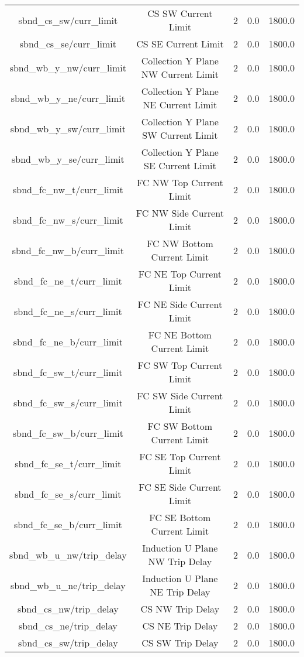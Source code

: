 \begin{center}
\begin{longtable}{c | c c c c }
sbnd\_cs\_sw/curr\_limit & CS SW Current Limit & 2 & 0.0 & 1800.0\\ 
sbnd\_cs\_se/curr\_limit & CS SE Current Limit & 2 & 0.0 & 1800.0\\ 
sbnd\_wb\_y\_nw/curr\_limit & Collection Y Plane NW Current Limit & 2 & 0.0 & 1800.0\\ 
sbnd\_wb\_y\_ne/curr\_limit & Collection Y Plane NE Current Limit & 2 & 0.0 & 1800.0\\ 
sbnd\_wb\_y\_sw/curr\_limit & Collection Y Plane SW Current Limit & 2 & 0.0 & 1800.0\\ 
sbnd\_wb\_y\_se/curr\_limit & Collection Y Plane SE Current Limit & 2 & 0.0 & 1800.0\\ 
sbnd\_fc\_nw\_t/curr\_limit & FC NW Top Current Limit & 2 & 0.0 & 1800.0\\ 
sbnd\_fc\_nw\_s/curr\_limit & FC NW Side Current Limit & 2 & 0.0 & 1800.0\\ 
sbnd\_fc\_nw\_b/curr\_limit & FC NW Bottom Current Limit & 2 & 0.0 & 1800.0\\ 
sbnd\_fc\_ne\_t/curr\_limit & FC NE Top Current Limit & 2 & 0.0 & 1800.0\\ 
sbnd\_fc\_ne\_s/curr\_limit & FC NE Side Current Limit & 2 & 0.0 & 1800.0\\ 
sbnd\_fc\_ne\_b/curr\_limit & FC NE Bottom Current Limit & 2 & 0.0 & 1800.0\\ 
sbnd\_fc\_sw\_t/curr\_limit & FC SW Top Current Limit & 2 & 0.0 & 1800.0\\ 
sbnd\_fc\_sw\_s/curr\_limit & FC SW Side Current Limit & 2 & 0.0 & 1800.0\\ 
sbnd\_fc\_sw\_b/curr\_limit & FC SW Bottom Current Limit & 2 & 0.0 & 1800.0\\ 
sbnd\_fc\_se\_t/curr\_limit & FC SE Top Current Limit & 2 & 0.0 & 1800.0\\ 
sbnd\_fc\_se\_s/curr\_limit & FC SE Side Current Limit & 2 & 0.0 & 1800.0\\ 
sbnd\_fc\_se\_b/curr\_limit & FC SE Bottom Current Limit & 2 & 0.0 & 1800.0\\ 
sbnd\_wb\_u\_nw/trip\_delay & Induction U Plane NW Trip Delay & 2 & 0.0 & 1800.0\\ 
sbnd\_wb\_u\_ne/trip\_delay & Induction U Plane NE Trip Delay & 2 & 0.0 & 1800.0\\ 
sbnd\_cs\_nw/trip\_delay & CS NW Trip Delay & 2 & 0.0 & 1800.0\\ 
sbnd\_cs\_ne/trip\_delay & CS NE Trip Delay & 2 & 0.0 & 1800.0\\ 
sbnd\_cs\_sw/trip\_delay & CS SW Trip Delay & 2 & 0.0 & 1800.0\\ 

\end{longtable}
\end{center}
